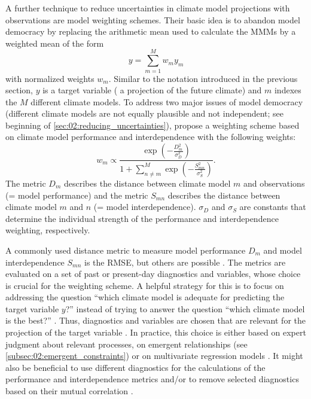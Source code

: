 A further technique to reduce uncertainties in climate model projections with
observations are model weighting schemes. Their basic idea is to abandon model
democracy by replacing the arithmetic mean used to calculate the \acp{MMM} by a
weighted mean of the form
\begin{equation}
  y = \sum_{m=1}^{M} w_m y_m
  \label{eq:02:weighted_mean}
\end{equation}
with normalized weights $w_m$. Similar to the notation introduced in the
previous section, $y$ is a target variable (\eg{} a projection of the future
climate) and $m$ indexes the $M$ different climate models. To address two major
issues of model democracy (different climate models are not equally plausible
and not independent; see beginning of \cref{sec:02:reducing_uncertainties}),
\textcite{Knutti2017a} propose a weighting scheme based on climate model
performance and interdependence with the following weights:
\begin{equation}
  w_m \propto \frac{\exp \left( -\frac{D_m^2}{\sigma_D^2} \right)}{1 + \sum_{n
    \neq m}^{M} \exp \left( -\frac{S_{mn}^2}{\sigma_S^2} \right)}.
  \label{eq:02:knutti_weights}
\end{equation}
The metric $D_m$ describes the distance between climate model $m$ and
observations (= model performance) and the metric $S_{mn}$ describes the
distance between climate model $m$ and $n$ (= model interdependence).
$\sigma_D$ and $\sigma_S$ are constants that determine the individual strength
of the performance and interdependence weighting, respectively.

A commonly used distance metric to measure model performance $D_m$ and model
interdependence $S_{mn}$ is the \ac{RMSE}, but others are possible
\autocite{Knutti2017a}. The metrics are evaluated on a set of past or
present-day diagnostics and variables, whose choice is crucial for the
weighting scheme. A helpful strategy for this is to focus on addressing the
question \enquote{which climate model is adequate for predicting the target
  variable $y$?} instead of trying to answer the question \enquote{which
  climate model is the best?} \autocite{Parker2009}. Thus, diagnostics and
variables are chosen that are relevant for the projection of the target
variable \autocite{Knutti2017a}. In practice, this choice is either based on
expert judgment about relevant processes, on emergent relationships (see
\cref{subsec:02:emergent_constraints}) or on multivariate regression models
. It
might also be beneficial to use different diagnostics for the calculations of
the performance and interdependence metrics \autocite{Merrifield2020} and/or to
remove selected diagnostics based on their mutual correlation
\autocite{Lorenz2018}.

